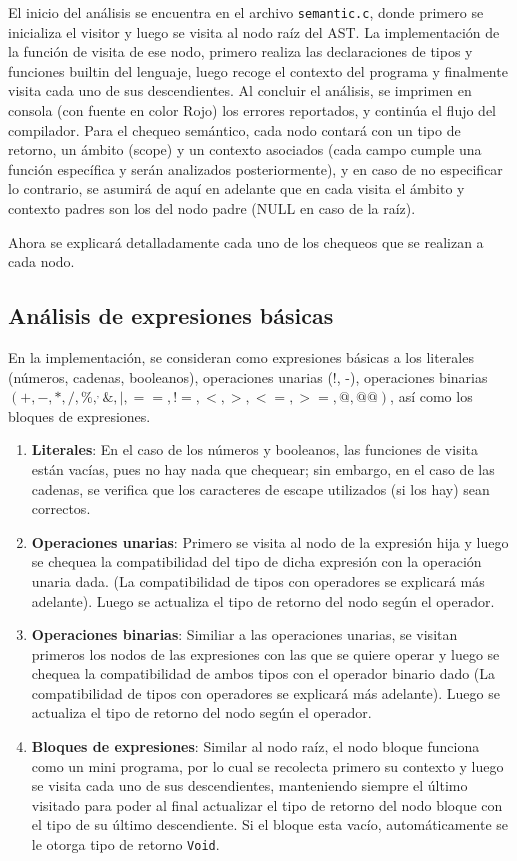 \documentclass{llncs}
\begin{document}
El inicio del análisis se encuentra en el archivo \texttt{semantic.c}, donde primero se inicializa el visitor y luego se visita al nodo raíz del AST. La implementación de la función de
visita de ese nodo, primero realiza las declaraciones de tipos y funciones builtin del lenguaje, luego recoge el contexto del programa y finalmente visita cada uno de sus
descendientes. Al concluir el análisis, se imprimen en consola (con fuente en color Rojo) los errores reportados, y continúa el flujo del compilador. 
Para el chequeo semántico, cada nodo contará con un tipo de retorno, un ámbito (scope) y un contexto asociados (cada campo cumple una función específica y serán analizados posteriormente), y en caso de no
especificar lo contrario, se asumirá de aquí en adelante que en cada visita el ámbito y contexto padres son los del nodo padre (NULL en caso de la raíz).

Ahora se explicará detalladamente cada uno de 
los chequeos que se realizan a cada nodo.

\subsection{Análisis de expresiones básicas}

En la implementación, se consideran como expresiones básicas a los literales (números, cadenas, booleanos), operaciones unarias (!, -), 
operaciones binarias $(+, -, *, /, \%, ^, \&, |, ==, !=, <, >, <=, >=, @, @@)$, así como los bloques de expresiones.
\begin{enumerate}
    \item \textbf{Literales}: En el caso de los números y booleanos, las funciones de visita están vacías, pues no hay nada que chequear; sin embargo,
    en el caso de las cadenas, se verifica que los caracteres de escape utilizados (si los hay) sean correctos.
    \item \textbf{Operaciones unarias}: Primero se visita al nodo de la expresión hija y luego se chequea la compatibilidad del tipo de dicha expresión con
    la operación unaria dada. (La compatibilidad de tipos con operadores se explicará más adelante). Luego se actualiza el tipo de retorno del nodo según el operador.
    \item \textbf{Operaciones binarias}: Similiar a las operaciones unarias, se visitan primeros los nodos de las expresiones con las que se quiere operar y luego 
    se chequea la compatibilidad de ambos tipos con el operador binario dado (La compatibilidad de tipos con operadores se explicará más adelante). Luego se actualiza el tipo 
    de retorno del nodo según el operador.
    \item \textbf{Bloques de expresiones}: Similar al nodo raíz, el nodo bloque funciona como un mini programa, por lo cual se recolecta primero su contexto y luego se visita cada uno de sus 
    descendientes, manteniendo siempre el último visitado para poder al final actualizar el tipo de retorno del nodo bloque con el tipo de su último descendiente. Si el bloque esta vacío, automáticamente 
    se le otorga tipo de retorno \texttt{Void}.
\end{enumerate}
\end{document}
